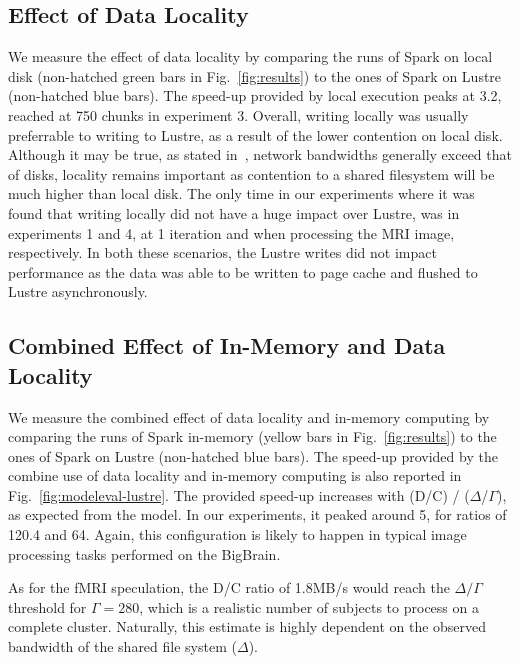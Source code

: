 \documentclass{IEEEtran}
\newcommand{\todo}[1]{\marginpar{\parbox{18mm}{\flushleft\tiny\color{red}\textbf{TODO}:
      #1}}}
\begin{document}
\subsection{Effect of Data Locality}
We measure the effect of data locality by comparing the runs of Spark
on local disk (non-hatched green bars in Fig.~\ref{fig:results}) to the 
ones of Spark on Lustre (non-hatched blue bars). The speed-up provided by 
local execution peaks at 3.2, reached at 750 chunks in experiment 3. Overall, 
writing locally was usually preferrable to writing to Lustre, as a result of the
lower contention on local disk. Although it may be true, as stated in~\cite{Anantharayanan2011datalocality},
network bandwidths generally exceed that of disks, locality remains important 
as contention to a shared filesystem will be much higher than local disk.\todo{This needs to be finished or removed.}
The only time in our experiments where it was found that writing locally did not
have a huge impact over Lustre, was in experiments 1 and 4, at 1 iteration and 
when processing the MRI image, respectively. In both these scenarios, the Lustre 
writes did not impact performance as the data was able to be written to page cache
and flushed to Lustre asynchronously.

\subsection{Combined Effect of In-Memory and Data Locality}
We measure the combined effect of data locality and in-memory computing 
by comparing the runs of Spark in-memory (yellow bars in 
Fig.~\ref{fig:results}) to the ones of Spark on Lustre (non-hatched 
blue bars). The speed-up provided by the combine use of data locality 
and in-memory computing is also reported in 
Fig.~\ref{fig:modeleval-lustre}. The provided speed-up increases with 
(D/C) / ($\Delta$/$\Gamma$), as expected from the model. In our 
experiments, it peaked around 5, for ratios of 120.4 and 64. Again, 
this configuration is likely to happen in typical image processing 
tasks performed on the BigBrain.

As for the fMRI speculation, the D/C 
ratio of 1.8MB/s would reach the $\Delta/\Gamma$ threshold for 
$\Gamma=280$, which is a realistic number of subjects to process on a 
complete cluster. Naturally, this estimate is highly dependent on the observed bandwidth
of the shared file system ($\Delta$).
\end{document}
